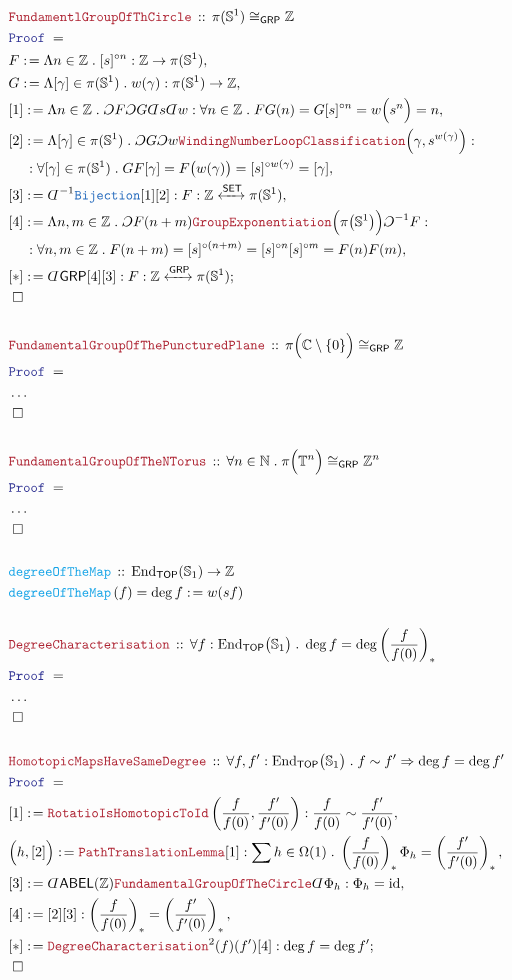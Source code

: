 \documentclass[12pt]{scrartcl}
\newcommand{\TYPE}[1]{\textcolor{NavyBlue}{\mathtt{#1}}}
\newcommand{\FUNC}[1]{\textcolor{Cerulean}{\mathtt{#1}}}
\newcommand{\LOGIC}[1]{\textcolor{Blue}{\mathtt{#1}}}
\newcommand{\THM}[1]{\textcolor{Maroon}{\mathtt{#1}}}
\renewcommand{\.}{\; . \;}
\newcommand{\de}{: \kern 0.1pc =}
\newcommand{\Act}[1]{\left( #1 \right)}
\newcommand{\Theorem}[2]{& \THM{#1} \, :: \, #2 \\ & \Proof = \\ }
\newcommand{\DeclareFunc}[2]{& \FUNC{#1} \, :: \, #2 \\}
\newcommand{\DefineNamedFunc}[4]{&  \FUNC{#1}\Act{#2} = #3 \de #4 \\}
\newcommand{\NewLine}{\\ & \kern 1pc}
\newcommand{\Page}[1]{ \begin{align*} #1 \end{align*}   }
\newcommand{ \bd }{ \ByDef }
\newcommand{\NoProof}{ & \ldots \\ \EndProof}
\newcommand{\Imply}{\Rightarrow}
\newcommand{\Int}{\mathbb{Z} }
\newcommand{\Complex}{\mathbb{C}}
\newcommand{\Sphere}{\mathbb{S}}
\newcommand{\Nat}{\mathbb{N} }
\DeclareMathOperator*{\id}{id}
\newcommand{\End}{\mathrm{End}}
\newcommand{\ToIso}{\xleftrightarrow}
\newcommand{\Say}[3]{& #1 \de #2 : #3, \\}
\newcommand{\Conclude}[3]{& #1 \de #2 : #3; \\}
\newcommand{\QED}{\; \square}
\newcommand{\EndProof}{& \QED \\}
\newcommand{\ByDef}{\rotatebox[origin=c]{-180}{$D$}}%
\newcommand{\ByConstr}{\rotatebox[origin=c]{-180}{$C$}}%
\newcommand{\Proof}{\LOGIC{Proof} \; }
\newcommand{\SET}{\mathsf{SET}}
\newcommand{\TOP}{\mathsf{TOP}}
\newcommand{\GRP}{\mathsf{GRP}}
\newcommand{\ABEL}{\mathsf{ABEL}}
\begin{document}
\Page{
	\Theorem{FundamentlGroupOfThCircle}
	{
		\pi(\Sphere^1) \cong_{\GRP} \Int
	}
	\Say{F}{\Lambda n \in \Int \. [s]^{\circ n}}{\Int \to \pi(\Sphere^1)}
	\Say{G}{\Lambda [\gamma] \in \pi(\Sphere^1) \. w(\gamma) }{\pi(\Sphere^1) \to \Int}
	\Say{[1]}{\Lambda n \in \Int \. \ByConstr F \ByConstr G \bd s \bd w}
	{
		\forall n \in \Int \. 
		FG(n) = 
		G[s]^{\circ n} =  
		w\Big(s^{n} \Big) =
		n
	}
	\Say{[2]}{
		\Lambda [\gamma] \in \pi(\Sphere^1) \.
		\ByConstr G
		\ByConstr w
		\THM{WindingNumberLoopClassification}\Big(\gamma,s^{w(\gamma)}\Big)
	}
	{
		\NewLine : 
		\forall [\gamma] \in \pi(\Sphere^1) \.
		GF[\gamma] = 
		F\big( w(\gamma) \big) =
		[s]^{\circ w(\gamma)} = [\gamma]
	}
	\Say{[3]}{\bd^{-1} \TYPE{Bijection}[1][2]}
	{
		F : \Int \ToIso{\SET} \pi(\Sphere^1)
	}
	\Say{[4]}{ 
		\Lambda n,m \in \Int \. 
		\ByConstr F(n + m)
		\THM{GroupExponentiation}\Big( \pi\big(\Sphere^1\big)\Big)
		\ByConstr^{-1} F
	}
	{
		\NewLine : 
		\forall n,m  \in \Int \.
		F(n + m) = 
		[s]^{\circ(n + m)} = 
		[s]^{\circ n} [s]^{\circ m} = 
		F(n) F(m)
	}
	\Conclude{[*]}{\bd \GRP [4][3]}
	{
		F : \Int \ToIso{\GRP} \pi(\Sphere^1)
	}
	\EndProof
	\\
	\Theorem{FundamentalGroupOfThePuncturedPlane}
	{
		\pi\Big(\Complex \setminus \{0\}\Big) \cong_\GRP \Int
	}
	\NoProof
	\\
	\Theorem{FundamentalGroupOfTheNTorus}
	{
		\forall n \in \Nat \.
		\pi\Big(\mathbb{T}^n\Big) \cong_\GRP \Int^n
	}
	\NoProof
	\\
	\DeclareFunc{degreeOfTheMap}{ \End_{\TOP}(\Sphere_1) \to \Int}
	\DefineNamedFunc{degreeOfTheMap}{f}{\deg f}{ w(sf)}
	\\
	\Theorem{DegreeCharacterisation}
	{
		\forall f : \End_\TOP\big(\Sphere_1 \big) \.
		\deg f =   \deg \left( \frac{f}{f(0)} \right)_*
	}
	\NoProof
	\\
	\Theorem{HomotopicMapsHaveSameDegree}
	{
		\forall f,f' : \End_\TOP\big(\Sphere_1 \big) \. 
		f \sim f' \Imply \deg f = \deg f'
	}
	\Say{[1]}{\THM{RotatioIsHomotopicToId}\left(\frac{f}{f(0)},\frac{f'}{f'(0)}\right)}
	{
		\frac{f}{f(0)} \sim \frac{f'}{f'(0)}
	}
	\Say{\Big( h,[2]\Big)}{ \THM{PathTranslationLemma}[1]}
	{
		\sum h \in \Omega(1) \. \left(\frac{f}{f(0)} \right)_* \Phi_h = \left(\frac{f'}{f'(0)}\right)_* 
	}
	\Say{[3]}{\bd \ABEL(\Int) \THM{FundamentalGroupOfTheCircle}\bd \Phi_h}{\Phi_h = \id}
	\Say{[4]}{[2][3]}{  \left(\frac{f}{f(0)} \right)_* = \left(\frac{f'}{f'(0)}\right)_* }
	\Conclude{[*]}{\THM{DegreeCharacterisation}^2(f)(f')[4]}{\deg f = \deg f'}
	\EndProof
}
\end{document}
